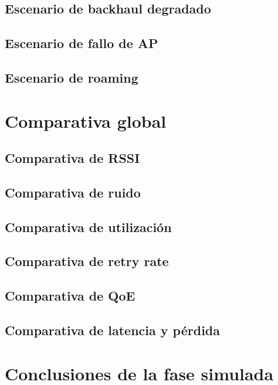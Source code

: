\subsection{Escenario de backhaul degradado}
\label{subsec:resultado-escenario-backhaul-degradado}

\subsection{Escenario de fallo de AP}
\label{subsec:resultado-escenario-fallo-ap}

\subsection{Escenario de roaming}
\label{subsec:resultado-escenario-roaming}


\section{Comparativa global}
\label{sec:comparativa-global}

\subsection{Comparativa de RSSI}
\label{subsec:comparativa-rssi}

\subsection{Comparativa de ruido}
\label{subsec:comparativa-ruido}

\subsection{Comparativa de utilización}
\label{subsec:comparativa-utilizacion}

\subsection{Comparativa de retry rate}
\label{subsec:comparativa-retry-rate}

\subsection{Comparativa de QoE}
\label{subsec:comparativa-qoe}

\subsection{Comparativa de latencia y pérdida}
\label{subsec:comparativa-latencia-perdida}


\section{Conclusiones de la fase simulada}
\label{sec:conclusiones-fase-simulada}